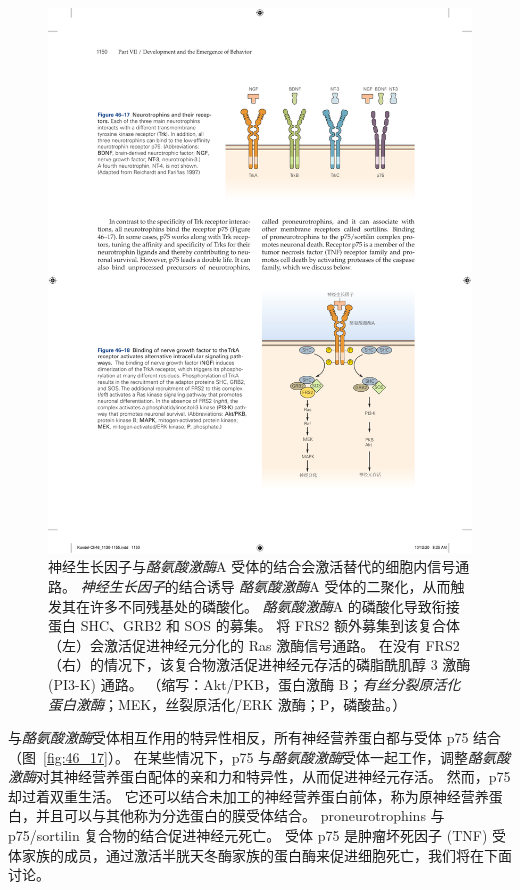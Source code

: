 \begin{figure}[htbp]
	\centering
	\includegraphics[width=0.5\linewidth]{chap46/fig_46_18}
	\caption{神经生长因子与\textit{酪氨酸激酶}A 受体的结合会激活替代的细胞内信号通路。
		\textit{神经生长因子}的结合诱导 \textit{酪氨酸激酶}A 受体的二聚化，从而触发其在许多不同残基处的磷酸化。
		\textit{酪氨酸激酶}A 的磷酸化导致衔接蛋白 SHC、GRB2 和 SOS 的募集。
		将 FRS2 额外募集到该复合体（左）会激活促进神经元分化的 Ras 激酶信号通路。
		在没有 FRS2（右）的情况下，该复合物激活促进神经元存活的磷脂酰肌醇 3 激酶 (PI3-K) 通路。
		（缩写：Akt/PKB，蛋白激酶 B；\textit{有丝分裂原活化蛋白激酶}；MEK，丝裂原活化/ERK 激酶；P，磷酸盐。）}
	\label{fig:46_18}
\end{figure}


与\textit{酪氨酸激酶}受体相互作用的特异性相反，所有神经营养蛋白都与受体 p75 结合（图~\ref{fig:46_17}）。
在某些情况下，p75 与\textit{酪氨酸激酶}受体一起工作，调整\textit{酪氨酸激酶}对其神经营养蛋白配体的亲和力和特异性，从而促进神经元存活。
然而，p75 却过着双重生活。
它还可以结合未加工的神经营养蛋白前体，称为原神经营养蛋白，并且可以与其他称为分选蛋白的膜受体结合。
proneurotrophins 与 p75/sortilin 复合物的结合促进神经元死亡。
受体 p75 是肿瘤坏死因子 (TNF) 受体家族的成员，通过激活半胱天冬酶家族的蛋白酶来促进细胞死亡，我们将在下面讨论。


